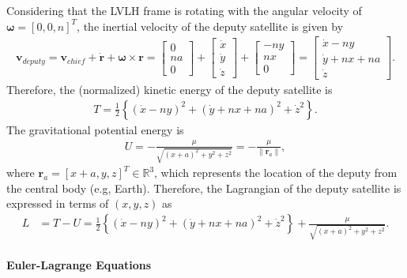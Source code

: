 \documentclass[10pt]{article}
\newcommand{\braces}[1]{\ensuremath{\left\{ #1 \right\}}}
\renewcommand{\Re}{\ensuremath{\mathbb{R}}}
\renewcommand{\r}{\mathbf{r}}
\begin{document}
Considering that the LVLH frame is rotating with the angular velocity of $\mathbf{\omega}=[0,0,n]^T$, the inertial velocity of the deputy satellite is given by
\begin{align*}
\mathbf{v}_{deputy}
=
\mathbf{v}_{chief} + \dot{\r} + \mathbf{\omega}\times \mathbf{r} = 
\begin{bmatrix}
0 \\ na \\ 0
\end{bmatrix}
+
\begin{bmatrix}
\dot x \\ \dot y \\ \dot z
\end{bmatrix}
+
\begin{bmatrix}
-n y \\ nx \\ 0
\end{bmatrix}
=
\begin{bmatrix}
\dot x - ny \\ \dot y + nx + na \\ \dot z
\end{bmatrix}.
\end{align*}
Therefore, the (normalized) kinetic energy of the deputy satellite is 
\begin{align*}
T = \frac{1}{2} \braces{(\dot x -ny)^2+(\dot y + nx +na)^2 + \dot z^2}.
\end{align*}
The gravitational potential energy is 
\begin{align*}
U = -\frac{\mu}{\sqrt{(x+a)^2 + y^2 + z^2}} = -\frac{\mu}{\|\r_a\|},
\end{align*}
where $\r_a=[x+a,y,z]^T\in\Re^3$, which represents the location of the deputy from the central body (e.g, Earth). Therefore, the Lagrangian of the deputy satellite is expressed in terms of $(x,y,z)$ as 
\begin{align}
L & = T-U = \frac{1}{2} \braces{(\dot x -ny)^2+(\dot y + nx +na)^2 + \dot z^2}
+\frac{\mu}{\sqrt{(x+a)^2 + y^2 + z^2}}.
\end{align}

\paragraph{Euler-Lagrange Equations}
\end{document}

